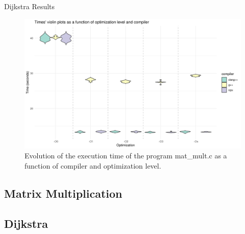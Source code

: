 \documentclass[english]{beamer}
\begin{document}
    \begin{frame}{Dijkstra Results}
    \begin{figure}[H]
    \centering
    \includegraphics[width=1\textwidth]{img/plots/violin_plot_dijkstra.png}
    \caption{Evolution of the execution time of the program mat\_mult.c as a function of compiler and optimization level.}
    \label{fig:image2}
    \end{figure}
    \end{frame}
    
    
    \subsection{Matrix Multiplication}
    \subsection{Dijkstra}
\end{document}
